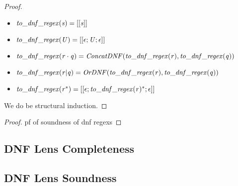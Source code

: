 \dnfrc*
\begin{proof}
\begin{definition}\leavevmode
\begin{itemize}
\item $\mathit{to\_dnf\_regex}(\mathit{s})=[[\mathit{s}]]$
\item $\mathit{to\_dnf\_regex}(\mathit{U})=[[\epsilon;\mathit{U};\epsilon]]$
\item $\mathit{to\_dnf\_regex}(\mathit{r}\cdot\mathit{q})=\mathit{ConcatDNF}(\mathit{to\_dnf\_regex}(\mathit{r}),\mathit{to\_dnf\_regex}(\mathit{q}))$
\item $\mathit{to\_dnf\_regex}(\mathit{r}|\mathit{q})=\mathit{OrDNF}(\mathit{to\_dnf\_regex}(\mathit{r}),\mathit{to\_dnf\_regex}(\mathit{q}))$
\item $\mathit{to\_dnf\_regex}(\mathit{r}^*)=[[\epsilon;\mathit{to\_dnf\_regex}(\mathit{r})^*;\epsilon]]$
\end{itemize}
\end{definition}
We do be structural induction.
\end{proof}

\dnfrs*
\begin{proof}
pf of soundness of dnf regexs
\end{proof}

\subsection{DNF Lens Completeness}
\dnflc*

\subsection{DNF Lens Soundness}

